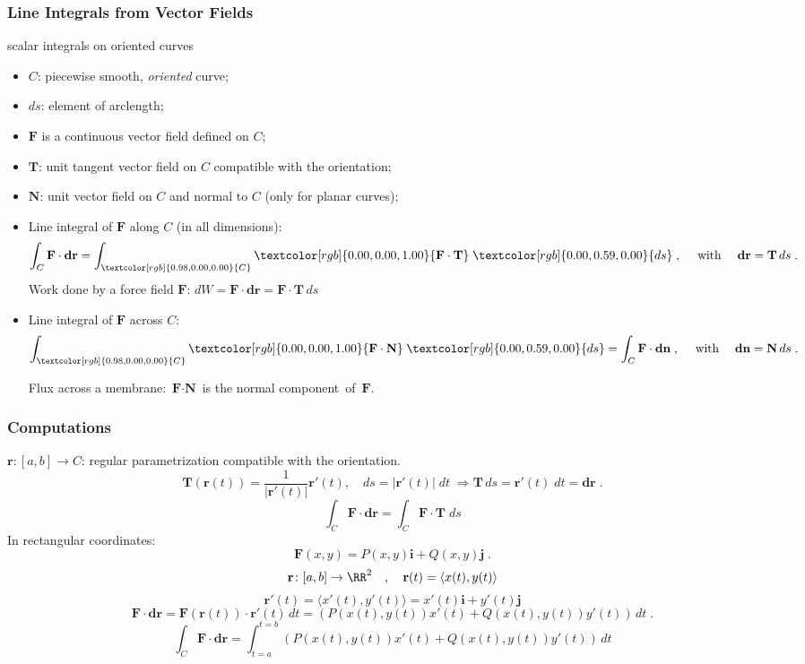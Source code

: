\begin{frame}
  \frametitle{Line Integrals from Vector Fields}

 \textcolor[rgb]{0.98,0.00,0.00}{scalar} integrals on \textcolor[rgb]{0.98,0.00,0.00}{oriented} curves
  \begin{itemize}
    \item $C$: piecewise smooth, \emph{oriented} curve;
    \item $ds$: element of arclength;
    \item \pause $\textbf{F}$ is a continuous vector field defined on $C$;
    \item \pause $\textbf{T}$: unit tangent vector field on $C$ compatible with the orientation;
    \item \pause $\textbf{N}$: unit vector field on $C$ and normal to $C$ (only for planar curves);
  \end{itemize}

  \begin{itemize}
    \item \pause Line integral of $\textbf{F}$ along $C$ (in all dimensions):
%
$$\int_C \textbf{F} \cdot \textbf{dr} = \int_{\textcolor[rgb]{0.98,0.00,0.00}{C}} \textcolor[rgb]{0.00,0.00,1.00}{\textbf{F} \cdot \textbf{T}} \; \textcolor[rgb]{0.00,0.59,0.00}{ds} \; ,\quad \text{ with } \quad \textbf{dr} = \textbf{T}\, ds \; .$$
%
Work done by a force field $\textbf{F}$: $dW = \textbf{F} \cdot \textbf{dr} = \textbf{F} \cdot \textbf{T} \, ds$
 \item \pause Line integral of $\textbf{F}$ across $C$:
$$\int_{\textcolor[rgb]{0.98,0.00,0.00}{C}} \textcolor[rgb]{0.00,0.00,1.00}{\textbf{F} \cdot \textbf{N}} \; \textcolor[rgb]{0.00,0.59,0.00}{ds} = \int_C \textbf{F} \cdot \textbf{dn} \; , \quad \text{ with } \quad \textbf{dn} = \textbf{N}\, ds \; .$$

Flux across a membrane: $\textbf{F}\cdot \textbf{N}$ is the normal component~of~$\textbf{F}$.
 \end{itemize}

\end{frame}

\begin{frame}
  \frametitle{Computations}
$\textbf{r} \colon [a,b] \to C$: regular parametrization compatible with the orientation.\pause
%
$$\textbf{T}(\textbf{r}(t)) = \frac{1}{|\textbf{r}'(t)|}\textbf{r}'(t), \quad  ds = |\textbf{r}'(t)| \; dt \; \Longrightarrow \textbf{T} \, ds = \textbf{r}'(t) \; dt = \textbf{dr}\; .$$
%
$$\int_C \textbf{F} \cdot \textbf{dr} = \int_C \textbf{F} \cdot \textbf{T} \; ds$$
%
\pause In rectangular coordinates:
%
$$\textbf{F}(x,y) = P(x,y) \textbf{i} + Q(x,y) \textbf{j}\; .$$
%
$$\textbf{r} \colon [a,b] \to \RR^2\quad ,\quad  \textbf{r}(t) = \langle x(t), y(t) \rangle$$
%
$$\textbf{r}'(t) = \langle x'(t), y'(t) \rangle = x'(t) \textbf{i} + y'(t) \textbf{j}$$
%
$$
  \textbf{F} \cdot \textbf{dr}  = \textbf{F}(\textbf{r}(t)) \cdot \textbf{r}'(t) \, dt = \left(P(x(t),y(t)) x'(t) + Q(x(t),y(t)) y'(t)\right) \, dt \; .
$$
%
$$\int_C \textbf{F} \cdot \textbf{dr} = \int_{t=a}^{t=b} \left(P(x(t),y(t)) x'(t) + Q(x(t),y(t)) y'(t)\right) \, dt$$
\end{frame}

